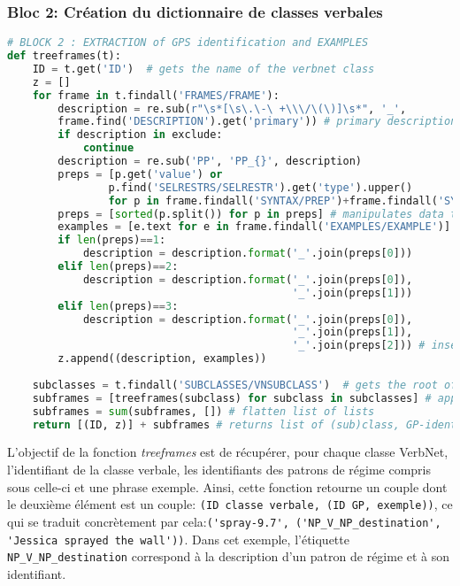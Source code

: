 \subsubsection{Bloc 2: Création du dictionnaire de classes verbales}

\begin{lstlisting}[language=Python, caption = Création du dictionnaire de classes verbales, label=fig:archivn-bloc2]
# BLOCK 2 : EXTRACTION of GPS identification and EXAMPLES
def treeframes(t):
    ID = t.get('ID')  # gets the name of the verbnet class
    z = []            
    for frame in t.findall('FRAMES/FRAME'):
        description = re.sub(r"\s*[\s\.\-\ +\\\/\(\)]\s*", '_',  
        frame.find('DESCRIPTION').get('primary')) # primary description = identification of a GP
        if description in exclude:
            continue
        description = re.sub('PP', 'PP_{}', description) 
        preps = [p.get('value') or 
                p.find('SELRESTRS/SELRESTR').get('type').upper()                  
                for p in frame.findall('SYNTAX/PREP')+frame.findall('SYNTAX/LEX')] 
        preps = [sorted(p.split()) for p in preps] # manipulates data to insert the prep. in desc.                                
        examples = [e.text for e in frame.findall('EXAMPLES/EXAMPLE')] # get ex. for each desc.
        if len(preps)==1:
            description = description.format('_'.join(preps[0]))
        elif len(preps)==2:
            description = description.format('_'.join(preps[0]),
                                             '_'.join(preps[1]))
        elif len(preps)==3:
            description = description.format('_'.join(preps[0]), 
                                             '_'.join(preps[1]), 
                                             '_'.join(preps[2])) # inserting preps in descriptions
        z.append((description, examples))
        
    subclasses = t.findall('SUBCLASSES/VNSUBCLASS')  # gets the root of each subclasses
    subframes = [treeframes(subclass) for subclass in subclasses] # applies function to subclasses
    subframes = sum(subframes, []) # flatten list of lists
    return [(ID, z)] + subframes # returns list of (sub)class, GP-identification and example
\end{lstlisting}

L'objectif de la fonction \emph{treeframes} est de récupérer, pour chaque classe VerbNet, l'identifiant de la classe verbale, les identifiants des patrons de régime compris sous celle-ci et une phrase exemple. Ainsi, cette fonction retourne un couple dont le deuxième élément est un couple: \texttt{(ID classe verbale, (ID \ac{GP}, exemple))}, ce qui se traduit concrètement par cela:\lstinline|('spray-9.7', ('NP_V_NP_destination', 'Jessica sprayed the wall'))|. Dans cet exemple, l'étiquette \lstinline|NP_V_NP_destination| correspond à la description d'un patron de régime et à son identifiant.

